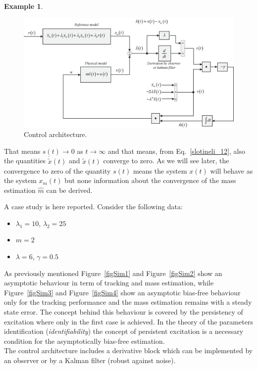 \documentclass[11pt,a4paper,oneside]{book}
\numberwithin{equation}{section}
\theoremstyle{it}
\theoremstyle{definition}
\newtheorem{example}{Example}[chapter]
\begin{document}
\begin{example}
\begin{figure}[H]
		\centering
		\includegraphics[width = 490pt, keepaspectratio]{figures/adaptive_control/slotine_example.eps}
		\captionsetup{width=0.75\textwidth}		
		\caption{Control architecture.}
		\label{figctrl}
	\end{figure}
	That means $s(t)\rightarrow 0$ as $t\rightarrow \infty$ and that means, from Eq.~\ref{slotineli_12}, also the quantities $\dot{\tilde{x}}(t)$ and $\tilde{x}(t)$ converge to zero. As we will see later, the convergence to zero of the quantity $s(t)$ means the system $x(t)$ will behave as the system $x_m(t)$ but none information about the convergence of the mass estimation $\hat{m}$ can be derived.
	
	A case study is here reported. Consider the following data:
	\begin{itemize}
		\item $\lambda_1=10$, $\lambda_2=25$
		\item $m=2$
		\item $\lambda=6$, $\gamma=0.5$
	\end{itemize}
	As previously mentioned Figure~\ref{figSim1} and Figure~\ref{figSim2} show an asymptotic behaviour in term of tracking and mass estimation, while Figure~\ref{figSim3} and Figure~\ref{figSim4} show an asymptotic bias-free behaviour only for the tracking performance and the mass estimation remains with a steady state error. The concept behind this behaviour is covered by the persistency of excitation where only in the first case is achieved. In the theory of the parameters identification (\textit{identifiability}) the concept of persistent excitation is a necessary condition for the asymptotically bias-free estimation.\\
	
	The control architecture includes a derivative block which can be implemented by an observer or by a Kalman filter (robust against noise). 
	

\end{example}
\end{document}
